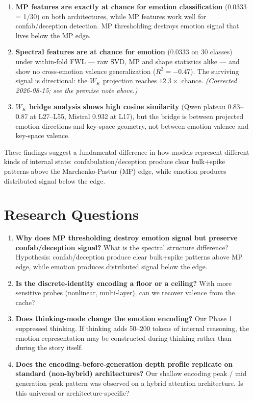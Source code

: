 \documentclass[11pt,letterpaper]{article}
\begin{document}
\begin{enumerate}[leftmargin=*]
  \item \textbf{MP features are exactly at chance for emotion
    classification} (0.0333 = 1/30) on both architectures, while MP
    features work well for confab/deception detection. MP thresholding
    destroys emotion signal that lives below the MP edge.

  \item \textbf{Spectral features are at chance for emotion} ($0.0333$ on 30
    classes) under within-fold FWL --- raw SVD, MP and shape statistics alike ---
    and show no cross-emotion valence generalization ($R^2 = -0.47$). The
    surviving signal is directional: the $W_K$ projection reaches $12.3\times$
    chance. \emph{(Corrected 2026-08-15; see the premise note above.)}

  \item \textbf{$W_K$ bridge analysis shows high cosine similarity}
    (Qwen plateau 0.83--0.87 at L27--L55, Mistral 0.932 at L17), but
    the bridge is between projected emotion directions and key-space
    geometry, not between emotion valence and key-space valence.
\end{enumerate}

\noindent These findings suggest a fundamental difference in how models
represent different kinds of internal state: confabulation/deception
produce clear bulk+spike patterns above the Marchenko-Pastur (MP)
edge, while emotion produces distributed signal below the edge.

\section{Research Questions}

\begin{enumerate}[leftmargin=*]
  \item \textbf{Why does MP thresholding destroy emotion signal but
    preserve confab/deception signal?} What is the spectral structure
    difference? Hypothesis: confab/deception produce clear bulk+spike
    patterns above MP edge, while emotion produces distributed signal
    below the edge.

  \item \textbf{Is the discrete-identity encoding a floor or a
    ceiling?} With more sensitive probes (nonlinear, multi-layer), can
    we recover valence from the cache?

  \item \textbf{Does thinking-mode change the emotion encoding?} Our
    Phase 1 suppressed thinking. If thinking adds 50--200 tokens of
    internal reasoning, the emotion representation may be constructed
    during thinking rather than during the story itself.

  \item \textbf{Does the encoding-before-generation depth profile
    replicate on standard (non-hybrid) architectures?} Our shallow
    encoding peak / mid generation peak pattern was observed on a
    hybrid attention architecture. Is this universal or
    architecture-specific?
\end{enumerate}
\end{document}
